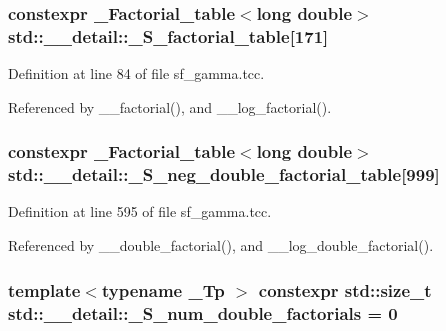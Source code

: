 \subsubsection[{\+\_\+\+S\+\_\+factorial\+\_\+table}]{\setlength{\rightskip}{0pt plus 5cm}constexpr {\bf \+\_\+\+Factorial\+\_\+table}$<$long double$>$ std\+::\+\_\+\+\_\+detail\+::\+\_\+\+S\+\_\+factorial\+\_\+table\mbox{[}171\mbox{]}}\label{namespacestd_1_1____detail_a008b54abe31c1027aefdfd7a76a40e99}


Definition at line 84 of file sf\+\_\+gamma.\+tcc.



Referenced by \+\_\+\+\_\+factorial(), and \+\_\+\+\_\+log\+\_\+factorial().

\hypertarget{namespacestd_1_1____detail_adb3fbe0d6f7c40b02e479b63d547f57c}{}
\subsubsection[{\+\_\+\+S\+\_\+neg\+\_\+double\+\_\+factorial\+\_\+table}]{\setlength{\rightskip}{0pt plus 5cm}constexpr {\bf \+\_\+\+Factorial\+\_\+table}$<$long double$>$ std\+::\+\_\+\+\_\+detail\+::\+\_\+\+S\+\_\+neg\+\_\+double\+\_\+factorial\+\_\+table\mbox{[}999\mbox{]}}\label{namespacestd_1_1____detail_adb3fbe0d6f7c40b02e479b63d547f57c}


Definition at line 595 of file sf\+\_\+gamma.\+tcc.



Referenced by \+\_\+\+\_\+double\+\_\+factorial(), and \+\_\+\+\_\+log\+\_\+double\+\_\+factorial().

\hypertarget{namespacestd_1_1____detail_a762f5ed905d1f926bfd8b16f8ea2c568}{}
\subsubsection[{\+\_\+\+S\+\_\+num\+\_\+double\+\_\+factorials}]{\setlength{\rightskip}{0pt plus 5cm}template$<$typename \+\_\+\+Tp $>$ constexpr std\+::size\+\_\+t std\+::\+\_\+\+\_\+detail\+::\+\_\+\+S\+\_\+num\+\_\+double\+\_\+factorials = 0}\label{namespacestd_1_1____detail_a762f5ed905d1f926bfd8b16f8ea2c568}


